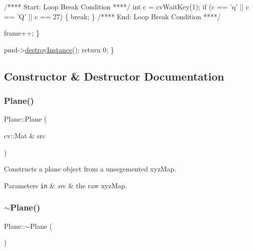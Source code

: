 \begin{DoxyCodeInclude}
        \textcolor{comment}{/**** Start: Loop Break Condition ****/}
        \textcolor{keywordtype}{int} c = cvWaitKey(1);
        \textcolor{keywordflow}{if} (c == \textcolor{charliteral}{'q'} || c == \textcolor{charliteral}{'Q'} || c == 27) \{
            \textcolor{keywordflow}{break};
        \}
        \textcolor{comment}{/**** End: Loop Break Condition ****/}

        frame++;
    \}

    pmd->\hyperlink{class_depth_camera_aaf7c09a863e906f61104f23af10a8597}{destroyInstance}();
    \textcolor{keywordflow}{return} 0;
\}
\end{DoxyCodeInclude}
 

\subsection{Constructor \& Destructor Documentation}
\hypertarget{class_plane_a94bc1ca29c305edb76676528b1a9465c}{}\label{class_plane_a94bc1ca29c305edb76676528b1a9465c} 
\subsubsection{\texorpdfstring{Plane()}{Plane()}}
{\footnotesize\ttfamily Plane\+::\+Plane (\begin{DoxyParamCaption}\item[{cv\+::\+Mat \&}]{src }\end{DoxyParamCaption})}



Constructs a plane object from a unsegemented xyz\+Map. 


\begin{DoxyParams}[1]{Parameters}
\mbox{\tt in}  & {\em src} & the raw xyz\+Map. \\
\hline
\end{DoxyParams}
\hypertarget{class_plane_a69abd86051c880dcb44b249ad10c4436}{}\label{class_plane_a69abd86051c880dcb44b249ad10c4436} 
\subsubsection{\texorpdfstring{$\sim$\+Plane()}{~Plane()}}
{\footnotesize\ttfamily Plane\+::$\sim$\+Plane (\begin{DoxyParamCaption}{ }\end{DoxyParamCaption})}



